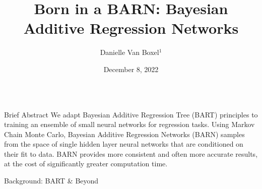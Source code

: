 \documentclass{beamer}
\title{\huge Born in a BARN: Bayesian Additive Regression Networks}
\author{Danielle Van Boxel$^{1}$}
\institute[UA:AM]{$^{1}$University of Arizona, Applied Math Program \\ \hphantom{1cm}}
\date{December 8, 2022}
\newlength{\columnheight}
\begin{document}
\begin{frame}
\begin{columns}
	\begin{column}{.33\textwidth}
		\begin{minipage}{.98\textwidth}  %
		\parbox[t][\columnheight]{\textwidth}{ %
		\begin{myblock}{Brief Abstract}
We adapt Bayesian Additive Regression Tree (BART)\cite{chipman2010bart} principles to training an ensemble of small neural networks\cite{schmidhuber2015deep} for regression tasks.  Using Markov Chain Monte Carlo\cite{hastings1970monte}, Bayesian Additive Regression Networks (BARN) samples from the space of single hidden layer neural networks that are conditioned on their fit to data.  BARN provides more consistent and often more accurate results, at the cost of significantly greater computation time.
		\end{myblock}
		\begin{myblock}{Background: BART \& Beyond}
\begin{figure}[h]

\end{figure}
\end{myblock}}
\end{minipage}
\end{column}
\end{columns}
\end{frame}
\end{document}
